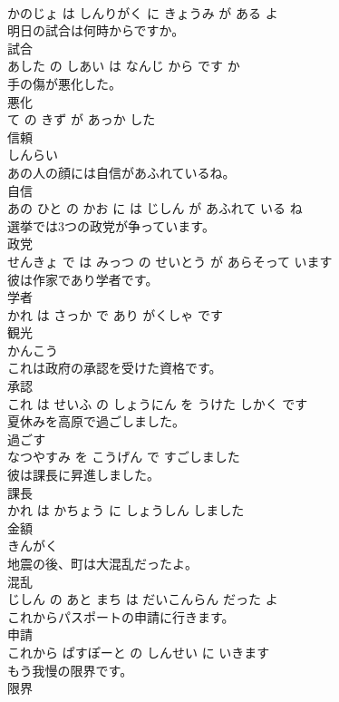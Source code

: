 \documentclass[8pt]{extreport}
\begin{document}
\begin{CJK}{UTF8}{min}
\\	かのじょ は しんりがく に きょうみ が ある よ			
\\	明日の試合は何時からですか。	
\\	試合 
\\	あした の しあい は なんじ から です か			
\\	手の傷が悪化した。	
\\	悪化 
\\	て の きず が あっか した			
\\	信頼	
\\	しんらい			
\\	あの人の顔には自信があふれているね。	
\\	自信 
\\	あの ひと の かお に は じしん が あふれて いる ね			
\\	選挙では3つの政党が争っています。	
\\	政党 
\\	せんきょ で は みっつ の せいとう が あらそって います			
\\	彼は作家であり学者です。	
\\	学者 
\\	かれ は さっか で あり がくしゃ です			
\\	観光	
\\	かんこう			
\\	これは政府の承認を受けた資格です。	
\\	承認 
\\	これ は せいふ の しょうにん を うけた しかく です			
\\	夏休みを高原で過ごしました。	
\\	過ごす 
\\	なつやすみ を こうげん で すごしました			
\\	彼は課長に昇進しました。	
\\	課長 
\\	かれ は かちょう に しょうしん しました			
\\	金額	
\\	きんがく			
\\	地震の後、町は大混乱だったよ。	
\\	混乱 
\\	じしん の あと まち は だいこんらん だった よ			
\\	これからパスポートの申請に行きます。	
\\	申請 
\\	これから ぱすぽーと の しんせい に いきます			
\\	もう我慢の限界です。	
\\	限界 

\end{CJK}
\end{document}

